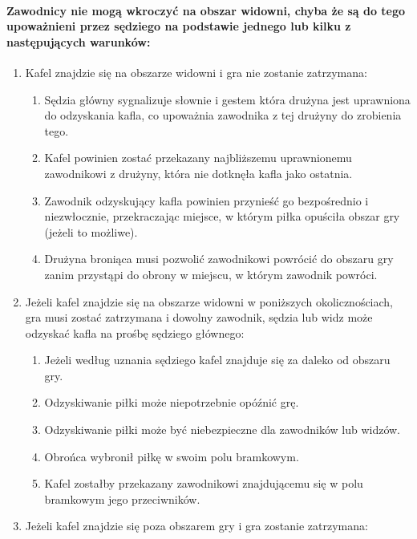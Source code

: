 \documentclass[12pt]{article}
\begin{document}
\paragraph{ Zawodnicy nie mogą wkroczyć na obszar widowni, chyba
że są do tego upoważnieni przez sędziego na podstawie jednego lub kilku
z następujących warunków:}

\begin{enumerate}
\item
    Kafel znajdzie się na obszarze widowni i gra nie zostanie zatrzymana:
  
  \begin{enumerate}
  \item
        Sędzia główny sygnalizuje słownie i gestem która drużyna jest
    uprawniona do odzyskania kafla, co upoważnia zawodnika z tej drużyny
    do zrobienia tego.
      \item
        Kafel powinien zostać przekazany najbliższemu uprawnionemu
    zawodnikowi z drużyny, która nie dotknęła kafla jako ostatnia.
      \item
        Zawodnik odzyskujący kafla powinien przynieść go bezpośrednio i
    niezwłocznie, przekraczając miejsce, w którym piłka opuściła obszar
    gry (jeżeli to możliwe).
      \item
        Drużyna broniąca musi pozwolić zawodnikowi powrócić do obszaru gry
    zanim przystąpi do obrony w miejscu, w którym zawodnik powróci.
      \end{enumerate}
\item
    Jeżeli kafel znajdzie się na obszarze widowni w poniższych
  okolicznościach, gra musi zostać zatrzymana i dowolny zawodnik, sędzia
  lub widz może odzyskać kafla na prośbę sędziego głównego:
  
  \begin{enumerate}
  \item
        Jeżeli według uznania sędziego kafel znajduje się za daleko od
    obszaru gry.
      \item
        Odzyskiwanie piłki może niepotrzebnie opóźnić grę.
      \item
        Odzyskiwanie piłki może być niebezpieczne dla zawodników lub widzów.
      \item
        Obrońca wybronił piłkę w swoim polu bramkowym.
      \item
        Kafel zostałby przekazany zawodnikowi znajdującemu się w polu
    bramkowym jego przeciwników.
      \end{enumerate}
\item
  Jeżeli kafel znajdzie się poza obszarem gry i gra zostanie zatrzymana:


\end{enumerate}
\end{document}
